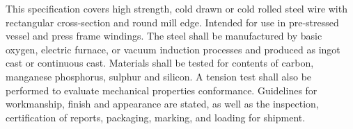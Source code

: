 This specification covers high strength, cold drawn or cold rolled steel wire with rectangular cross-section and round mill edge. Intended for use in pre-stressed vessel and press frame windings. The steel shall be manufactured by basic oxygen, electric furnace, or vacuum induction processes and produced as ingot cast or continuous cast. Materials shall be tested for contents of carbon, manganese phosphorus, sulphur and silicon. A tension test shall also be performed to evaluate mechanical properties conformance. Guidelines for workmanship, finish and appearance are stated, as well as the inspection, certification of reports, packaging, marking, and loading for shipment.